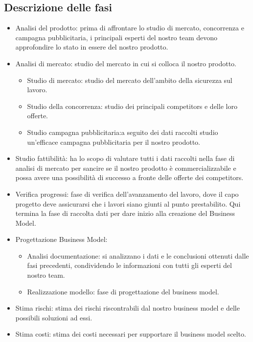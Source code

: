 \subsection{Descrizione delle fasi}
\begin{itemize}

\item Analisi del prodotto: prima di affrontare lo studio di mercato, concorrenza e campagna pubblicitaria, i principali esperti del nostro team devono approfondire lo stato in essere del nostro prodotto.

\item Analisi di mercato: studio del mercato in cui si colloca il nostro prodotto.
\begin{itemize}

\item Studio di mercato: studio del mercato dell'ambito della sicurezza sul lavoro.

\item Studio della concorrenza: studio dei principali competitors e delle loro offerte.

\item Studio campagna pubblicitaria:a seguito dei dati raccolti studio un'efficace campagna pubblicitaria per il nostro prodotto.

\end{itemize}

\item Studio fattibilità: ha lo scopo di valutare tutti i dati raccolti nella fase di analisi di mercato per sancire se il nostro prodotto è commercializzabile e possa avere una possibilità di successo a fronte delle offerte dei competitors.

\item Verifica progressi: fase di verifica dell'avanzamento del lavoro, dove il capo progetto deve assicurarsi che i lavori siano giunti al punto prestabilito. Qui termina la fase di raccolta dati per dare inizio alla creazione del Business Model. 

\item Progettazione Business Model:

\begin{itemize}

\item Analisi documentazione: si analizzano i dati e le conclusioni ottenuti dalle fasi precedenti, condividendo le informazioni con tutti gli esperti del nostro team.

\item Realizzazione modello: fase di progettazione del business model.

\end{itemize}

\item Stima rischi: stima dei rischi riscontrabili dal nostro business model e delle possibili soluzioni ad essi.

\item Stima costi: stima dei costi necessari per supportare il business model scelto.

\end{itemize}



